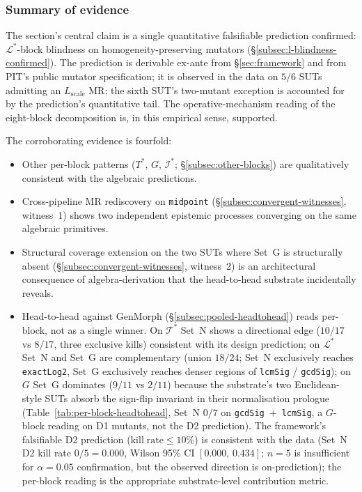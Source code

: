 \documentclass[acmsmall, screen]{acmart}
\begin{document}
\subsubsection{Summary of evidence}
\label{subsec:empirical-summary}

The section's central claim is a single quantitative falsifiable
prediction confirmed: $\mathcal{L}^{*}$-block blindness on
homogeneity-preserving mutators
(\S\ref{subsec:l-blindness-confirmed}). The prediction is derivable
ex-ante from \S\ref{sec:framework} and from PIT's public mutator
specification; it is observed in the data on $5/6$ SUTs admitting an
$L_{\mathrm{scale}}$ MR; the sixth SUT's two-mutant exception is
accounted for by the prediction's quantitative tail. The
operative-mechanism reading of the eight-block decomposition is, in
this empirical sense, supported.

The corroborating evidence is fourfold:
\begin{itemize}[nosep,leftmargin=*]
  \item Other per-block patterns ($T^{*}$, $G$, $\mathcal{I}^{*}$;
        \S\ref{subsec:other-blocks}) are qualitatively consistent
        with the algebraic predictions.
  \item Cross-pipeline MR rediscovery on \texttt{midpoint}
        (\S\ref{subsec:convergent-witnesses}, witness~1) shows two
        independent epistemic processes converging on the same
        algebraic primitives.
  \item Structural coverage extension on the two SUTs where Set~G
        is structurally absent (\S\ref{subsec:convergent-witnesses},
        witness~2) is an architectural consequence of
        algebra-derivation that the head-to-head substrate
        incidentally reveals.
  \item Head-to-head against GenMorph
        (\S\ref{subsec:pooled-headtohead}) reads per-block, not as a
        single winner. On $\mathcal{T}^{*}$ Set~N shows a directional
        edge ($10/17$ vs $8/17$, three exclusive kills) consistent with
        its design prediction; on $\mathcal{L}^{*}$ Set~N and Set~G
        are complementary (union $18/24$; Set~N exclusively reaches
        \texttt{exactLog2}, Set~G exclusively reaches denser regions
        of \texttt{lcmSig} / \texttt{gcdSig}); on $G$ Set~G dominates
        ($9/11$ vs $2/11$) because the substrate's two Euclidean-
        style SUTs absorb the sign-flip invariant in their
        normalisation prologue (Table~\ref{tab:per-block-headtohead},
        Set~N $0/7$ on \texttt{gcdSig}~+~\texttt{lcmSig}, a $G$-block
        reading on D1 mutants, not the D2 prediction). The
        framework's falsifiable D2 prediction
        ($\mathrm{kill\;rate} \le 10\%$) is consistent with the data
        (Set~N D2 kill rate $0/5 = 0.000$, Wilson 95\% CI
        $[0.000,\,0.434]$; $n = 5$ is insufficient for $\alpha = 0.05$
        confirmation, but the observed direction is on-prediction);
        the per-block reading is the appropriate substrate-level
        contribution metric.
\end{itemize}
\end{document}
